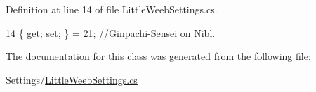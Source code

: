 Definition at line 14 of file Little\+Weeb\+Settings.\+cs.


\begin{DoxyCode}
14 \{ \textcolor{keyword}{get}; \textcolor{keyword}{set}; \} = 21; \textcolor{comment}{//Ginpachi-Sensei on Nibl.}
\end{DoxyCode}


The documentation for this class was generated from the following file\+:\begin{DoxyCompactItemize}
\item 
Settings/\mbox{\hyperlink{_little_weeb_settings_8cs}{Little\+Weeb\+Settings.\+cs}}\end{DoxyCompactItemize}
